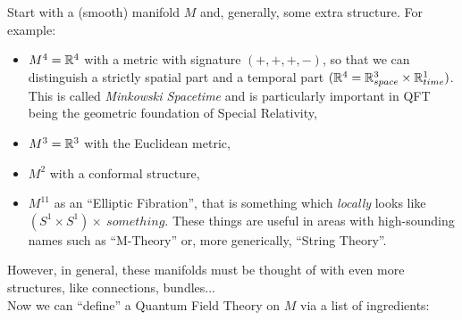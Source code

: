 \bigskip

\noindent Start with a (smooth) manifold $M$ and, generally, some extra structure. For example:
\begin{itemize}
    \item $M^4=\mathbb{R}^4$ with a metric with signature $(+, +, +, -)$, so that we can distinguish a strictly spatial part and a temporal part $(\mathbb{R}^4=\mathbb{R}^3_{space}\times\mathbb{R}^1_{time})$. This is called \textit{Minkowski Spacetime} and is particularly important in QFT being the geometric foundation of Special Relativity,
    \item $M^3=\mathbb{R}^3$ with the Euclidean metric,
    \item $M^2$ with a conformal structure,
    \item $M^{11}$ as an ``Elliptic Fibration'', that is something which \textit{locally} looks like $\left(S^1\times S^1\right)\times \ something$. These things are useful in areas with high-sounding names such as ``M-Theory'' or, more generically, ``String Theory''.
\end{itemize}
However, in general, these manifolds must be thought of with even more structures, like connections, bundles...\\
Now we can ``define'' a Quantum Field Theory on $M$ via a list of ingredients:
